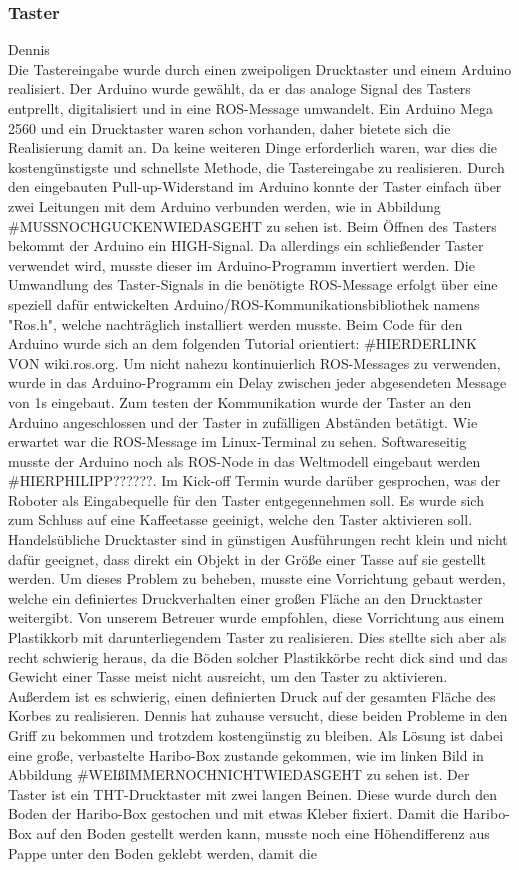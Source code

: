 \documentclass[a4paper,12pt,headsepline]{scrartcl}
\begin{document}
	\subsubsection{Taster}
		Dennis\\
	Die Tastereingabe wurde durch einen zweipoligen Drucktaster und einem Arduino realisiert. Der Arduino wurde gewählt, da er das analoge Signal des Tasters entprellt, digitalisiert und in eine ROS-Message umwandelt. Ein Arduino Mega 2560 und ein Drucktaster waren schon vorhanden, daher bietete sich die Realisierung damit an. Da keine weiteren Dinge erforderlich waren, war dies die kostengünstigste und schnellste Methode, die Tastereingabe zu realisieren. Durch den eingebauten Pull-up-Widerstand im Arduino konnte der Taster einfach über zwei Leitungen mit dem Arduino verbunden werden, wie in Abbildung {#MUSSNOCHGUCKENWIEDASGEHT} zu sehen ist. Beim Öffnen des Tasters bekommt der Arduino ein HIGH-Signal. Da allerdings ein schließender Taster verwendet wird, musste dieser im Arduino-Programm invertiert werden. Die Umwandlung des Taster-Signals in die benötigte ROS-Message erfolgt über eine speziell dafür entwickelten Arduino/ROS-Kommunikationsbibliothek namens "Ros.h", welche nachträglich installiert werden musste. Beim Code für den Arduino wurde sich an dem folgenden Tutorial orientiert: {#HIERDERLINK VON wiki.ros.org}. Um nicht nahezu kontinuierlich ROS-Messages zu verwenden, wurde in das Arduino-Programm ein Delay zwischen jeder abgesendeten Message von 1s eingebaut. Zum testen der Kommunikation wurde der Taster an den Arduino angeschlossen und der Taster in zufälligen Abständen betätigt. Wie erwartet war die ROS-Message im Linux-Terminal zu sehen. Softwareseitig musste der Arduino noch als ROS-Node in das Weltmodell eingebaut werden {#HIERPHILIPP??????}. Im Kick-off Termin wurde darüber gesprochen, was der Roboter als Eingabequelle für den Taster entgegennehmen soll. Es wurde sich zum Schluss auf eine Kaffeetasse geeinigt, welche den Taster aktivieren soll. Handelsübliche Drucktaster sind in günstigen Ausführungen recht klein und nicht dafür geeignet, dass direkt ein Objekt in der Größe einer Tasse auf sie gestellt werden. Um dieses Problem zu beheben, musste eine Vorrichtung gebaut werden, welche ein definiertes Druckverhalten einer großen Fläche an den Drucktaster weitergibt. Von unserem Betreuer wurde empfohlen, diese Vorrichtung aus einem Plastikkorb mit darunterliegendem Taster zu realisieren. Dies stellte sich aber als recht schwierig heraus, da die Böden solcher Plastikkörbe recht dick sind und das Gewicht einer Tasse meist nicht ausreicht, um den Taster zu aktivieren. Außerdem ist es schwierig, einen definierten Druck auf der gesamten Fläche des Korbes zu realisieren. Dennis hat zuhause versucht, diese beiden Probleme in den Griff zu bekommen und trotzdem kostengünstig zu bleiben. Als Lösung ist dabei eine große, verbastelte Haribo-Box zustande gekommen, wie im linken Bild in Abbildung {#WEIßIMMERNOCHNICHTWIEDASGEHT} zu sehen ist. Der Taster ist ein THT-Drucktaster mit zwei langen Beinen. Diese wurde durch den Boden der Haribo-Box gestochen und mit etwas Kleber fixiert. Damit die Haribo-Box auf den Boden gestellt werden kann, musste noch eine Höhendifferenz aus Pappe unter den Boden geklebt werden, damit die 
\end{document}
